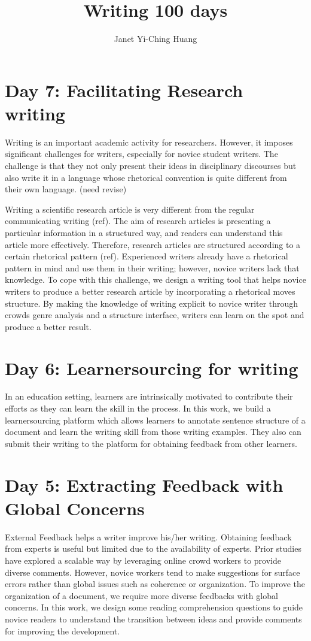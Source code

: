 \documentclass[a4paper]{article}
\title{\textbf{Writing 100 days}}
\author{Janet Yi-Ching Huang}
\begin{document}
\maketitle
\section{Day 7: Facilitating Research writing}
Writing is an important academic activity for researchers. However, it imposes significant challenges for writers, especially for novice student writers. The challenge is that they not only present their ideas in disciplinary discourses but also write it in a language whose rhetorical convention is quite different from their own language. (need revise)

Writing a scientific research article is very different from the regular communicating writing (ref). The aim of research articles is presenting a particular information in a structured way, and readers can understand this article more effectively. Therefore, research articles are structured according to a certain rhetorical pattern (ref). Experienced writers already have a rhetorical pattern in mind and use them in their writing; however, novice writers lack that knowledge. To cope with this challenge, we design a writing tool that helps novice writers to produce a better research article by incorporating a rhetorical moves structure. By making the knowledge of writing explicit to novice writer through crowds genre analysis and a structure interface, writers can learn on the spot and produce a better result. 

\section{Day 6: Learnersourcing for writing}
In an education setting, learners are intrinsically motivated to contribute their efforts as they can learn the skill in the process. In this work, we build a learnersourcing platform which allows learners to annotate sentence structure of a document and learn the writing skill from those writing examples. They also can submit their writing to the platform for obtaining feedback from other learners. 

\section{Day 5: Extracting Feedback with Global Concerns}
External Feedback helps a writer improve his/her writing. Obtaining feedback from experts is useful but limited due to the availability of experts. Prior studies have explored a scalable way by leveraging online crowd workers to provide diverse comments. However, novice workers tend to make suggestions for surface errors rather than global issues such as coherence or organization. To improve the organization of a document, we require more diverse feedbacks with global concerns. In this work, we design some reading comprehension questions to guide novice readers to understand the transition between ideas and provide comments for improving the development.
\end{document}
